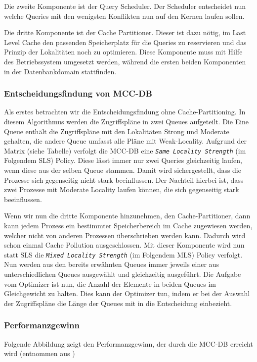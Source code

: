Die zweite Komponente ist der Query Scheduler. Der Scheduler entscheidet nun welche Queries mit den wenigsten Konflikten nun auf den Kernen laufen sollen.

Die dritte Komponente ist der Cache Partitioner. Dieser ist dazu nötig, im Last Level Cache den passenden Speicherplatz für die Queries zu reservieren und das Prinzip der Lokalitäten noch zu optimieren. Diese Komponente muss mit Hilfe des Betriebssystem umgesetzt werden, während die ersten beiden Komponenten in der Datenbankdomain stattfinden.

\subsubsection*{Entscheidungsfindung von MCC-DB}
Als erstes betrachten wir die Entscheidungsfindung ohne Cache-Partitioning. In diesem Algorithmus werden die Zugriffspläne in zwei Queues aufgeteilt. Die Eine Queue enthält die Zugriffspläne mit den Lokalitäten Strong und Moderate gehalten, die andere Queue umfasst alle Pläne mit Weak-Locality. Aufgrund der Matrix (siehe Tabelle) verfolgt die MCC-DB eine \texttt{\textit{Same Locality Strength}} (im Folgendem SLS) Policy. Diese lässt immer nur zwei Queries gleichzeitig laufen, wenn diese aus der selben Queue stammen. Damit wird sichergestellt, dass die Prozesse sich gegenseitig nicht stark beeinflussen. Der Nachteil hierbei ist, dass zwei Prozesse mit Moderate Locality laufen können, die sich gegenseitig stark beeinflussen.

Wenn wir nun die dritte Komponente hinzunehmen, den Cache-Partitioner, dann kann jedem Prozess ein bestimmter Speicherbereich im Cache zugewiesen werden, welcher nicht von anderen Prozessen überschrieben werden kann. Dadurch wird schon einmal Cache Pollution ausgeschlossen. Mit dieser Komponente wird nun statt SLS die \texttt{\textit{Mixed Locality Strength}} (im Folgendem MLS) Policy verfolgt. Nun werden aus den bereits erwähnten Queues immer jeweils einer aus unterschiedlichen Queues ausgewählt und gleichzeitig ausgeführt. Die Aufgabe vom Optimizer ist nun, die Anzahl der Elemente in beiden Queues im Gleichgewicht zu halten. Dies kann der Optimizer tun, indem er bei der Auswahl der Zugriffspläne die Länge der Queues mit in die Entscheidung einbezieht.

\subsubsection*{Performanzgewinn}
Folgende Abbildung zeigt den Performanzgewinn, der durch die MCC-DB erreicht wird (entnommen aus \cite{LEE})

